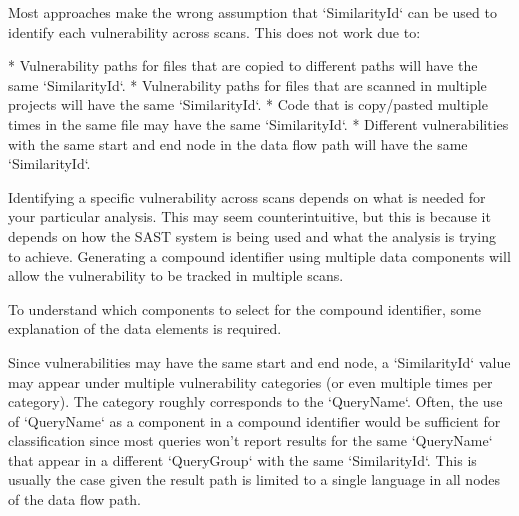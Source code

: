 Most approaches make the wrong assumption that `SimilarityId` can be used to identify each vulnerability across scans.  This does not work due to:

* Vulnerability paths for files that are copied to different paths will have the same `SimilarityId`.
* Vulnerability paths for files that are scanned in multiple projects will have the same `SimilarityId`.
* Code that is copy/pasted multiple times in the same file may have the same `SimilarityId`.
* Different vulnerabilities with the same start and end node in the data flow path will have the same `SimilarityId`.

Identifying a specific vulnerability across scans depends on what is needed for your particular analysis.  This may seem counterintuitive, but this is because it depends on how the SAST system is being used and what the analysis is trying to achieve.  Generating a compound identifier using multiple data components will allow the vulnerability to be tracked in multiple scans.

To understand which components to select for the compound identifier, some explanation of the data elements is required.





Since vulnerabilities may have the same start and end node, a `SimilarityId` value may appear under multiple vulnerability categories (or even multiple times per category).  The category roughly corresponds to the `QueryName`.  Often, the use of `QueryName` as a component in a compound identifier would be sufficient for classification since most queries won't report results for the same `QueryName` that appear in a different `QueryGroup` with the same `SimilarityId`.  This is usually the case given the result path is limited to a single language in all nodes of the data flow path.

